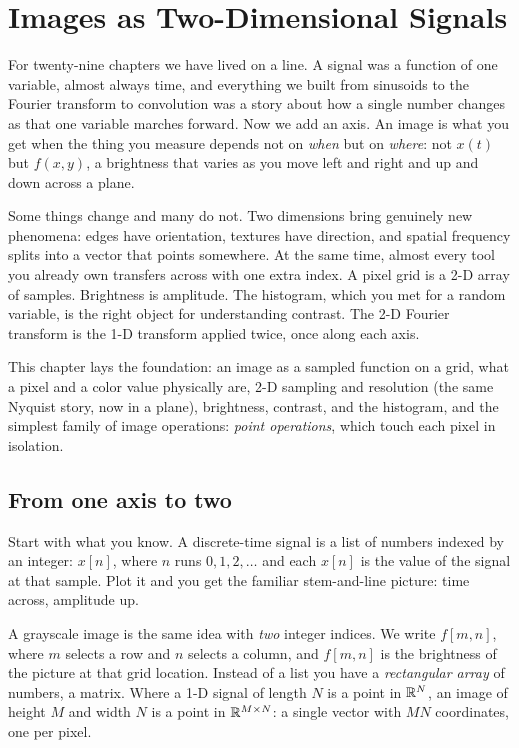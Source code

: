 \chapter{Images as Two-Dimensional Signals}

For twenty-nine chapters we have lived on a line. A signal was a function of one
variable, almost always time, and everything we built from sinusoids to the
Fourier transform to convolution was a story about how a single number changes
as that one variable marches forward. Now we add an axis. An image
is what you get when the thing you measure depends not on \emph{when} but on
\emph{where}: not $x(t)$ but $f(x,y)$, a brightness that varies as you move left
and right and up and down across a plane.

Some things change and many do not. Two
dimensions bring genuinely new phenomena: edges have
orientation, textures have direction, and spatial frequency splits into a vector that
points somewhere. At the same time, almost every tool you already own transfers
across with one extra index. A pixel grid is a 2-D array of
samples. Brightness is amplitude. The histogram, which you met for a
random variable, is the right object for understanding contrast. The 2-D Fourier transform is the 1-D
transform applied twice, once along each axis.

This chapter lays the foundation: an image as a sampled function on a grid, what a
pixel and a color value physically are, 2-D sampling and resolution (the same
Nyquist story, now in a plane), brightness, contrast, and the histogram, and the
simplest family of image operations: \emph{point operations}, which touch each
pixel in isolation.

\chapterline

\section{From one axis to two}
\label{ch30:one-to-two}

Start with what you know. A discrete-time signal is a list of numbers indexed by
an integer: $x[n]$, where $n$ runs $0,1,2,\dots$ and each $x[n]$ is the value of
the signal at that sample. Plot it and you get the familiar stem-and-line
picture: time across, amplitude up.

A grayscale image is the same idea with \emph{two} integer indices. We write
$f[m,n]$, where $m$ selects a row and $n$ selects a column, and $f[m,n]$ is the
brightness of the picture at that grid location. Instead of a list you have a
\emph{rectangular array} of numbers, a matrix.
Where a 1-D signal of length $N$ is a point in $\mathbb{R}^N$, an image of height $M$ and
width $N$ is a point in $\mathbb{R}^{M\times N}$: a single vector with $MN$ coordinates,
one per pixel.

